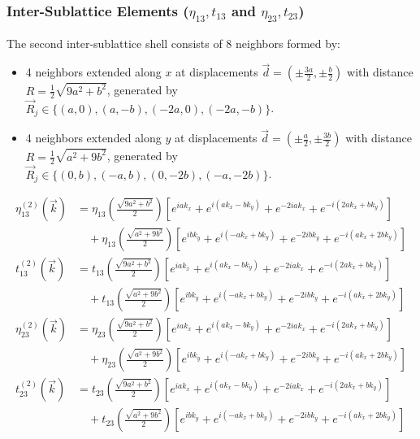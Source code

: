 \documentclass[11pt]{article}
\begin{document}
\subsubsection*{Inter-Sublattice Elements ($\eta_{13}, t_{13}$ and $\eta_{23}, t_{23}$)}

The second inter-sublattice shell consists of 8 neighbors formed by:
\begin{itemize}
    \item 4 neighbors extended along $x$ at displacements $\vec{d} = \left(\pm \frac{3a}{2}, \pm \frac{b}{2}\right)$ with distance $R = \frac{1}{2}\sqrt{9a^{2} + b^{2}}$, generated by $\vec{R}_{j} \in \{(a,0), (a,-b), (-2a,0), (-2a,-b)\}$.
    \item 4 neighbors extended along $y$ at displacements $\vec{d} = \left(\pm \frac{a}{2}, \pm \frac{3b}{2}\right)$ with distance $R = \frac{1}{2}\sqrt{a^{2} + 9b^{2}}$, generated by $\vec{R}_{j} \in \{(0,b), (-a,b), (0,-2b), (-a,-2b)\}$.
\end{itemize}

\begin{align*}
\eta_{13}^{(2)}(\vec{k}) &= \eta_{13}\left(\frac{\sqrt{9 a^{2} + b^{2}}}{2} \right) \left[ e^{i a k_{x}} + e^{i(a k_{x} - b k_{y})} + e^{-2i a k_{x}} + e^{-i(2a k_{x} + b k_{y})} \right] \\
&\quad + \eta_{13}\left(\frac{\sqrt{a^{2} + 9 b^{2}}}{2} \right) \left[ e^{i b k_{y}} + e^{i(-a k_{x} + b k_{y})} + e^{-2i b k_{y}} + e^{-i(a k_{x} + 2b k_{y})} \right] \\[1em]
t_{13}^{(2)}(\vec{k}) &= t_{13}\left(\frac{\sqrt{9 a^{2} + b^{2}}}{2} \right) \left[ e^{i a k_{x}} + e^{i(a k_{x} - b k_{y})} + e^{-2i a k_{x}} + e^{-i(2a k_{x} + b k_{y})} \right] \\
&\quad + t_{13}\left(\frac{\sqrt{a^{2} + 9 b^{2}}}{2} \right) \left[ e^{i b k_{y}} + e^{i(-a k_{x} + b k_{y})} + e^{-2i b k_{y}} + e^{-i(a k_{x} + 2b k_{y})} \right] \\[1em]
\eta_{23}^{(2)}(\vec{k}) &= \eta_{23}\left(\frac{\sqrt{9 a^{2} + b^{2}}}{2} \right) \left[ e^{i a k_{x}} + e^{i(a k_{x} - b k_{y})} + e^{-2i a k_{x}} + e^{-i(2a k_{x} + b k_{y})} \right] \\
&\quad + \eta_{23}\left(\frac{\sqrt{a^{2} + 9 b^{2}}}{2} \right) \left[ e^{i b k_{y}} + e^{i(-a k_{x} + b k_{y})} + e^{-2i b k_{y}} + e^{-i(a k_{x} + 2b k_{y})} \right] \\[1em]
t_{23}^{(2)}(\vec{k}) &= t_{23}\left(\frac{\sqrt{9 a^{2} + b^{2}}}{2} \right) \left[ e^{i a k_{x}} + e^{i(a k_{x} - b k_{y})} + e^{-2i a k_{x}} + e^{-i(2a k_{x} + b k_y)} \right] \\
&\quad + t_{23}\left(\frac{\sqrt{a^{2} + 9 b^{2}}}{2} \right) \left[ e^{i b k_{y}} + e^{i(-a k_{x} + b k_{y})} + e^{-2i b k_{y}} + e^{-i(a k_{x} + 2b k_{y})} \right]
\end{align*}
\end{document}
